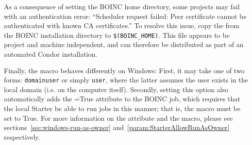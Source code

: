 As a consequence of setting the BOINC home directory, some projects may 
fail with an authentication error: ``Scheduler request failed: Peer 
certificate cannot be authenticated with known CA certificates.'' To 
resolve this issue, copy the  from the BOINC installation 
directory to \texttt{\$(BOINC\_HOME)}.  This file appears to be project and 
machine independent, and can therefore be distributed as part of an 
automated Condor installation.

Finally, the  macro behaves differently on Windows:
First, it may take one of two forms: \texttt{domain\Bs user} or simply 
\texttt{user}, where the latter assumes the user exists in the local domain 
(i.e. on the computer itself).  Secondly, setting this option also 
automatically adds the =True attribute to the BOINC job, 
which requires that the local Starter be able to run jobs in this 
manner; that is, the  macro must 
be set to True.  For more information on the  attribute and 
the  macro, please see 
sections~\ref{sec:windows-run-as-owner} 
and~\ref{param:StarterAllowRunAsOwner} respectively.

